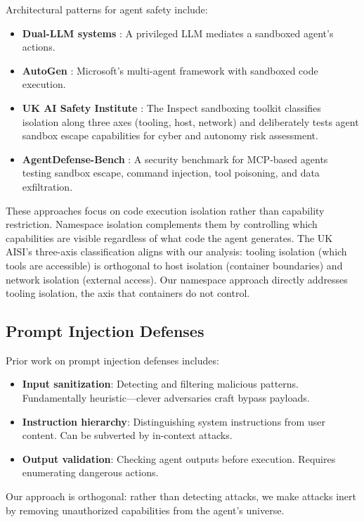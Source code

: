 \documentclass{article}
\begin{document}
Architectural patterns for agent safety include:
\begin{itemize}
    \item \textbf{Dual-LLM systems} \cite{masood2024sandboxed}: A privileged LLM mediates a sandboxed agent's actions.
    \item \textbf{AutoGen} \cite{autogen2023}: Microsoft's multi-agent framework with sandboxed code execution.
    \item \textbf{UK AI Safety Institute} \cite{aisi2025sandboxing}: The Inspect sandboxing toolkit classifies isolation along three axes (tooling, host, network) and deliberately tests agent sandbox escape capabilities for cyber and autonomy risk assessment.
    \item \textbf{AgentDefense-Bench} \cite{agentdefensebench2025}: A security benchmark for MCP-based agents testing sandbox escape, command injection, tool poisoning, and data exfiltration.
\end{itemize}

These approaches focus on code execution isolation rather than capability restriction. Namespace isolation complements them by controlling which capabilities are visible regardless of what code the agent generates. The UK AISI's three-axis classification aligns with our analysis: tooling isolation (which tools are accessible) is orthogonal to host isolation (container boundaries) and network isolation (external access). Our namespace approach directly addresses tooling isolation, the axis that containers do not control.

\subsection{Prompt Injection Defenses}

Prior work on prompt injection defenses includes:
\begin{itemize}
    \item \textbf{Input sanitization}: Detecting and filtering malicious patterns. Fundamentally heuristic---clever adversaries craft bypass payloads.
    \item \textbf{Instruction hierarchy}: Distinguishing system instructions from user content. Can be subverted by in-context attacks.
    \item \textbf{Output validation}: Checking agent outputs before execution. Requires enumerating dangerous actions.
\end{itemize}

Our approach is orthogonal: rather than detecting attacks, we make attacks inert by removing unauthorized capabilities from the agent's universe.
\end{document}
